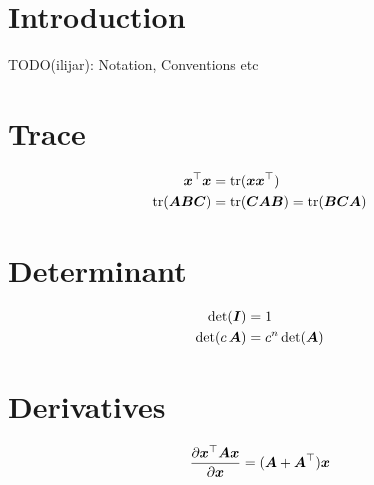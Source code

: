\documentclass{article}
\title{\doctitle}
\author{\docauthor}
\begin{document}
\maketitle

\section{Introduction}
TODO(ilijar): Notation, Conventions etc

\section{Trace}

\begin{align}
  \vec x\T \vec x
    &= \tr{\vec x \vec x\T} \\
  \tr{\mat A \mat B \mat C}
    &= \tr{\mat C \mat A \mat B} = \tr{\mat B \mat C \mat A}
\end{align}

\section{Determinant}

\begin{align}
  \determ{\mat I}
    &= 1 \\
  \determ{c \, \mat A}
    &= c^{n} \, \determ{\mat A}
\end{align}

\newpage
\section{Derivatives}

\begin{align}
  \frac{\partial \vec x\T \mat A \vec x}{\partial \vec x}
    = (\mat A + \mat A\T) \vec x
\end{align}
\end{document}
